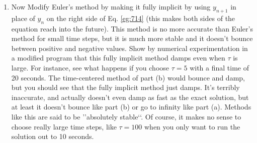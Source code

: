 \documentclass{book}
\theoremstyle{plain}
\theoremstyle{definition}
\numberwithin{exm}{chapter}
\theoremstyle{remark}
\theoremstyle{summary}
\theoremstyle{overview}
\begin{document}
\begin{enumerate}[label=(\alph*)]
\item  Now Modify Euler\rq s method by making it fully implicit by using $y_{n+1}$
in place of $y_n$ on the right side of Eq. \eqref{eg:714} (this makes both sides of
the equation reach into the future). This method is no more accurate
than Euler\rq s method for small time steps, but it is much more stable
and it doesn\rq t bounce between positive and negative values.
Show by numerical experimentation in a modified program that this
fully implicit method damps even when $ \tau $ is large. For instance, see
what happens if you choose $ \tau = 5$ with a final time of 20 seconds. The
time-centered method of part (b) would bounce and damp, but you
should see that the fully implicit method just damps. It\rq s terribly inaccurate, and actually doesn\rq t even damp as fast as the exact solution,
but at least it doesn\rq t bounce like part (b) or go to infinity like part (a).
Methods like this are said to be \rq\rq absolutely stable\lq\lq. Of course, it makes
no sense to choose really large time steps, like $ \tau = 100$ when you only
want to run the solution out to 10 seconds.

\end{enumerate}
\end{document}
